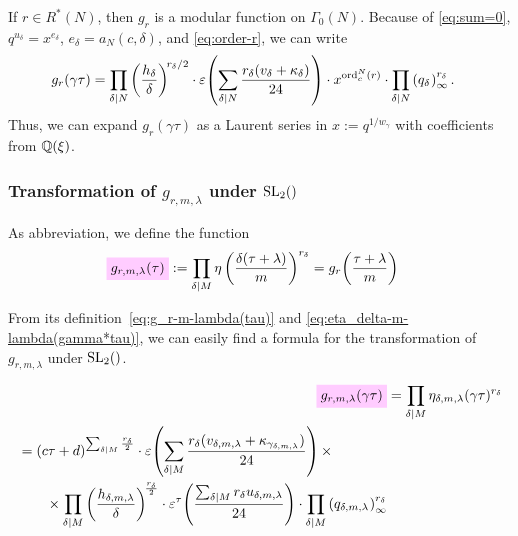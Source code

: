 \documentclass{article}
\begin{document}
If $r\in R^*(N)$, then $g_r$ is a modular function on $\Gamma_0(N)$.
Because of \eqref{eq:sum=0}, $q^{u_\delta}=x^{e_\delta}$,
$e_\delta=a_N(c, \delta)$, and \eqref{eq:order-r}, we can write
\begin{align}
  g_r(\gamma \tau)
  &=
  \divisorprod{N}
  \left(\frac{h_\delta}{\delta}\right)^{\!r_\delta/2}
  \cdot
  \unityPower{\divisorsum{N} \frac{r_\delta(v_\delta + \kappa_\delta)}{24}}
  \cdot
  x^{\ord^N_c(r)}
  \cdot
  \divisorprod{N} \eulerFunction[q_\delta]{}^{r_\delta}.
  \label{eq:modular-g_r(gamma*tau)}
\end{align}
Thus, we can expand $g_r(\gamma\tau)$ as a Laurent series in
$x:=q^{1/w_\gamma}$ with coefficients from $\mathbb{Q}(\xi)$.


\subsubsection{Transformation of $g_{r,m,\lambda}$ under $\SL2Z$}

As abbreviation, we define the function
\begin{align}
  \defineNotation[g-r-m-lambda-tau]{g_{r,m,\lambda}(\tau)}
  &:=
  \divisorprod{M}
  \eta\left(\frac{\delta(\tau+\lambda)}{m}\right)^{r_\delta}
  =
  g_r\!\left(\frac{\tau+\lambda}{m}\right)
  \label{eq:g_r-m-lambda(tau)}
\end{align}

From its definition~\eqref{eq:g_r-m-lambda(tau)} and
\eqref{eq:eta_delta-m-lambda(gamma*tau)}, we can easily find a formula
for the transformation of $g_{r,m,\lambda}$ under $\SL2Z$.

\begin{align}
  \defineNotation[g-r-m-lambda-gamma-tau]{g_{r,m,\lambda}(\gamma\tau)}
  &=
    \divisorprod{M}
    \eta_{\delta,m,\lambda}(\gamma\tau)^{r_\delta}\notag\\
  \begin{split}
  &=
    (c\tau+d)^{\divisorsum{M} \frac{r_\delta}{2}} \cdot
    \unityPower{\divisorsum{M}\frac{r_\delta(v_{\delta,m,\lambda} +
    \kappa_{\gamma_{\delta,m,\lambda}})}{24}} \times\\
  & \qquad\times
    \divisorprod{M}
    \left(\frac{h_{\delta,m,\lambda}}{\delta}\right)^{\!\frac{r_\delta}{2}}
    \cdot
    \unityPowerTau{\frac{\divisorsum{M} r_\delta u_{\delta,m,\lambda}}{24}}
    \cdot
    \divisorprod{M}
    \eulerFunction[q_{\delta,m,\lambda}]{}^{r_\delta}
  \end{split}
  \label{eq:g_r-m-lambda(gamma*tau)}
\end{align}
\end{document}
